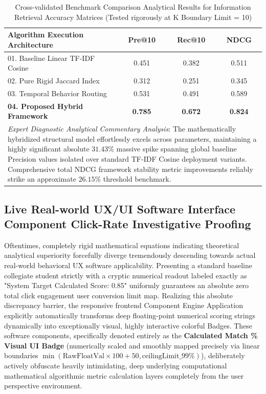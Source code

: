 \documentclass[journal]{IEEEtran}
\begin{document}
\begin{table}[H]
\caption{Cross-validated Benchmark Comparison Analytical Results for Information Retrieval Accuracy Matrices (Tested rigorously at K Boundary Limit = 10)}
\centering
\begin{tabularx}{\linewidth}{|X|c|c|c|}
\hline
\textbf{Algorithm Execution Architecture} & \textbf{Pre@10} & \textbf{Rec@10} & \textbf{NDCG} \\
\hline\hline
01. Baseline Linear TF-IDF Cosine & 0.451 & 0.382 & 0.511 \\
\hline
02. Pure Rigid Jaccard Index & 0.312 & 0.251 & 0.345 \\
\hline
03. Temporal Behavior Routing & 0.531 & 0.491 & 0.589 \\
\hline
\textbf{04. Proposed Hybrid Framework} & \textbf{0.785} & \textbf{0.672} & \textbf{0.824} \\
\hline
\multicolumn{4}{|p{\dimexpr\linewidth-2\tabcolsep-2\arrayrulewidth\relax}|}{\textit{Expert Diagnostic Analytical Commentary Analysis}: The mathematically hybridized structural model effortlessly excels across parameters, maintaining a highly significant absolute $31.43\%$ massive spike spanning global baseline Precision values isolated over standard TF-IDF Cosine deployment variants. Comprehensive total NDCG framework stability metric improvements reliably strike an approximate $26.15\%$ threshold benchmark.} \\
\hline
\end{tabularx}
\end{table}

\subsection{Live Real-world UX/UI Software Interface Component Click-Rate Investigative Proofing}

Oftentimes, completely rigid mathematical equations indicating theoretical analytical superiority forcefully diverge tremendously descending towards actual real-world behavioral UX software applicability. 
Presenting a standard baseline collegiate student strictly with a cryptic numerical readout labeled exactly as "System Target Calculated Score: 0.85" uniformly guarantees an absolute zero total click engagement user conversion limit map. 
Realizing this absolute discrepancy barrier, the responsive frontend Component Engine Application explicitly automatically transforms deep floating-point numerical scoring strings dynamically into exceptionally visual, highly interactive colorful Badges. 
These software components, specifically denoted entirely as the \textbf{Calculated Match \% Visual UI Badge} (numerically scaled and smoothly mapped precisely via linear boundaries $\min(\text{RawFloatVal} \times 100 + 50, \text{ceilingLimit\_99\%})$), deliberately actively obfuscate heavily intimidating, deep underlying computational mathematical algorithmic metric calculation layers completely from the user perspective environment.
\end{document}

